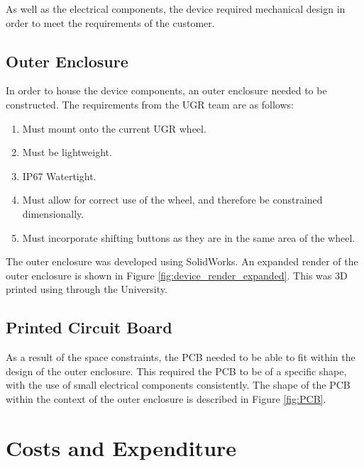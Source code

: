 \documentclass[a4paper,12pt]{article}
\begin{document}
As well as the electrical components, the device required mechanical design in order to meet the requirements of the customer.

\subsection{Outer Enclosure}
\label{sec:outer_enclosure}

In order to house the device components, an outer enclosure needed to be constructed. The requirements from the UGR team are as follows:

\begin{enumerate}
  \item Must mount onto the current UGR wheel.
  \item Must be lightweight.
  \item IP67 Watertight.
  \item Must allow for correct use of the wheel, and therefore be constrained dimensionally.
  \item Must incorporate shifting buttons as they are in the same area of the wheel.
\end{enumerate}

The outer enclosure was developed using SolidWorks. An expanded render of the outer enclosure is shown in Figure \ref{fig:device_render_expanded}. This was 3D printed using through the University.



\subsection{Printed Circuit Board}
\label{sec:printed_circuit_board}

As a result of the space constraints, the PCB needed to be able to fit within the design of the outer enclosure. This required the PCB to be of a specific shape, with the use of small electrical components consistently. The shape of the PCB within the context of the outer enclosure is described in Figure \ref{fig:PCB}.




\newpage
\section{Costs and Expenditure}
\label{sec:cost}
\end{document}
